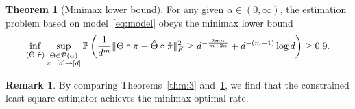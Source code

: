 \documentclass[11pt]{article}
\theoremstyle{definition}
\newtheorem{thm}{Theorem}
\newtheorem{rmk}{Remark}
\begin{document}
\begin{thm}[Minimax lower bound]\label{thm:minimax}For any given $\alpha\in(0,\infty)$, the estimation problem based on model~\eqref{eq:model} obeys the minimax lower bound 
\begin{equation}\label{eq:minimax}
\inf_{(\hat \Theta,\hat \pi)}\sup_{\substack{\Theta\in \mathcal{P}(\alpha)\\ \pi\colon[d]\to[d]}} \mathbb{P}\left({1\over d^m}\lVert\Theta\circ \pi-\hat \Theta\circ \hat \pi\rVert_F^2 \geq d^{-{2m\alpha\over m+2\alpha}}+d^{-(m-1)}\log d \right) \geq 0.9.
\end{equation}
\end{thm}
\begin{rmk} By comparing Theorems~\ref{thm:3} and~\ref{thm:minimax}, we find that the constrained least-square estimator achieves the minimax optimal rate. 
\end{rmk}
\end{document}
